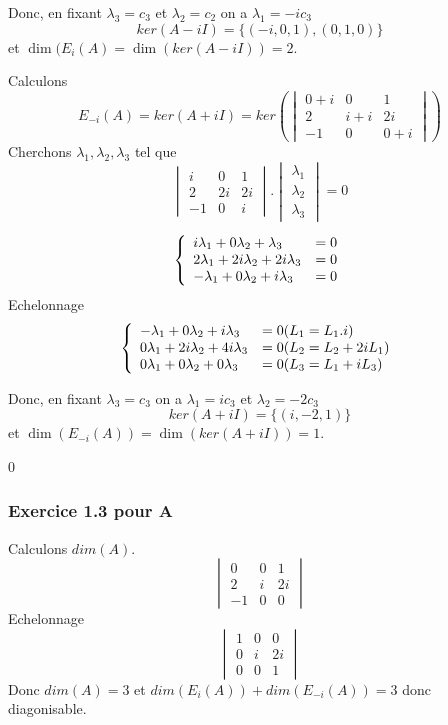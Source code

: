 \documentclass[]{book}
\theoremstyle{definition}
\begin{document}
Donc, en fixant $\lambda_3 = c_3$ et $\lambda_2=c_2$ on a $\lambda_1 = -ic_3$
$$ker(A-iI) = \{(-i,0,1), (0,1,0)\}$$ 
et $\dim(E_i(A) = \dim(ker(A-iI)) = 2$.

Calculons
$$E_{-i}(A) = ker(A +iI) = ker\left(\begin{vmatrix} 0+i & 0 & 1 \\ 2 & i+i & 2i \\ -1 & 0 & 0+i \end{vmatrix}\right)$$
Cherchons $\lambda_1,\lambda_2,\lambda_3$  tel que
$$\begin{vmatrix} i & 0 & 1 \\ 2 & 2i & 2i \\ -1 & 0 & i \end{vmatrix}.\begin{vmatrix} \lambda_1 \\ \lambda_2 \\ \lambda_3 \end{vmatrix} = 0$$

$$
\left\{ 
\begin{array}{l l}
i\lambda_{1} + 0\lambda_{2} + \lambda_{3} & = 0\\
2\lambda_{1} + 2i\lambda_{2} + 2i\lambda_{3} & = 0\\
-\lambda_{1} + 0\lambda_{2} + i\lambda_{3} & = 0\\
\end{array}
\right. 
$$ 
Echelonnage
$$
\left\{ 
\begin{array}{l l}
-\lambda_{1} + 0\lambda_{2} + i\lambda_{3} & = 0 (L_1=L_1.i)\\
0\lambda_{1} + 2i\lambda_{2} + 4i\lambda_{3} & = 0 (L_2=L_2+2iL_1)\\
0\lambda_{1} + 0\lambda_{2} + 0\lambda_{3} & = 0 (L_3=L_1+iL_3)\\
\end{array}
\right. 
$$ 

Donc, en fixant $\lambda_3 = c_3$ on a $\lambda_1 = ic_3$ et $\lambda_2 = -2c_3$
$$ker(A+iI) = \{(i,-2,1)\}$$ 
et $\dim(E_{-i}(A)) = \dim(ker(A+iI)) = 1$.

0

\subsubsection*{Exercice 1.3 pour A}
Calculons $dim(A)$.
$$\begin{vmatrix} 0 & 0 & 1 \\ 2 & i & 2i \\ -1 & 0 & 0 \end{vmatrix}$$
Echelonnage
$$\begin{vmatrix} 1 & 0 & 0  \\ 0 & i & 2i \\ 0 & 0 & 1 \end{vmatrix}$$
Donc $dim(A)=3$ et $dim(E_{i}(A))+dim(E_{-i}(A)) = 3$ donc diagonisable.
\end{document}
